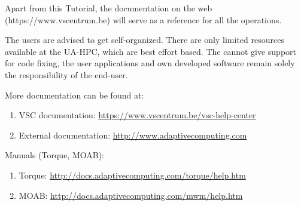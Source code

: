\begin{prompt}
\end{prompt}
\fi

Apart from this \hpc Tutorial, the \hpc documentation on the web
(https://www.vscentrum.be) will serve as a reference for all the \hpc
operations.

 The users are advised to get self-organized. There are
only limited resources available at the UA-HPC, which are best effort based.
The \hpc cannot give support for code fixing, the user applications and own
developed software remain solely the responsibility of the end-user.

More documentation can be found at:

\begin{enumerate}
  \item  VSC documentation: \url{https://www.vscentrum.be/vsc-help-center}
  \item  External documentation: \url{http://www.adaptivecomputing.com}
\end{enumerate}

Manuals (Torque, MOAB):

\begin{enumerate}
  \item  Torque: \url{http://docs.adaptivecomputing.com/torque/help.htm}
  \item  MOAB: \url{http://docs.adaptivecomputing.com/mwm/help.htm}
\end{enumerate}


